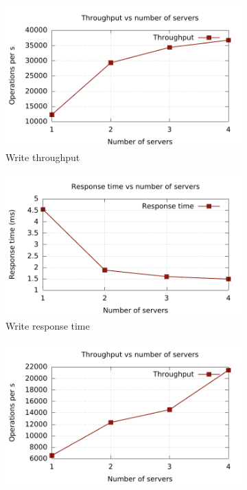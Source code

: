 \documentclass[11pt,a4paper]{globis-book}
\begin{document}
\begin{figure}
    \centering
    \begin{subfigure}[b]{0.5\linewidth}
        \includegraphics[scale=0.5]{images/plots/insert-distributed-tp}
        \caption{Write throughput}
        \label{fig:exp-dist-insert-tp} 
    \end{subfigure}%
    \begin{subfigure}[b]{0.5\linewidth}
        \includegraphics[scale=0.5]{images/plots/insert-distributed-rt}
        \caption{Write response time}
        \label{fig:exp-dist-insert-rt} 
    \end{subfigure}
    \begin{subfigure}[b]{0.5\linewidth}
        \includegraphics[scale=0.5]{images/plots/read-distributed-tp}

\end{subfigure}
\end{figure}
\end{document}
